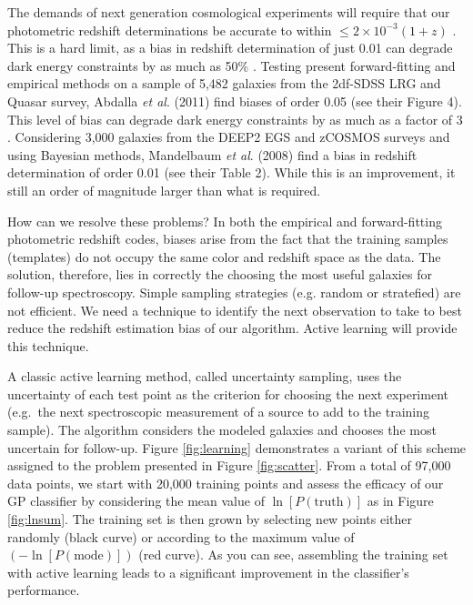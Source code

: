 \documentclass[useAMS,usenatbib,tightenlines,11pt,preprint]{aastex}
\begin{document}
The demands of next generation cosmological experiments will require
that our photometric redshift determinations be accurate to within
$\le 2\times 10^{-3}(1+z)$ \cite{desc}.  This is a hard limit, as a
bias in redshift determination of just 0.01 can degrade dark energy
constraints by as much as 50\%
\cite{kitching,huterer2006,nakajima2011}.  Testing present forward-fitting
and empirical methods on a sample of 5,482 galaxies from the 2df-SDSS
LRG and Quasar survey, Abdalla {\it et al}. (2011) find biases of
order 0.05 (see their Figure 4).  This level of bias can degrade dark
energy constraints by as much as a factor of 3 \cite{Ma2006}.
Considering 3,000 galaxies from the DEEP2 EGS and zCOSMOS surveys and
using Bayesian methods, Mandelbaum {\it et al}.  (2008) find a bias in
redshift determination of order 0.01 (see their Table 2).  While this
is an improvement, it still an order of magnitude larger than what is
required.

How can we resolve these problems?  In both the empirical and forward-fitting
photometric redshift codes, biases arise from the fact that the
training samples (templates) do not occupy the same color and redshift
space as the data.  The solution, therefore, lies in correctly the choosing the
most useful galaxies for follow-up spectroscopy.  
Simple sampling strategies (e.g. random or
stratefied) are not efficient.  We need a technique to identify the
next observation to take to best reduce the redshift estimation
bias of our algorithm.  Active learning will provide this technique.
 
A classic active learning method, called uncertainty sampling, uses
the uncertainty of each test point as the criterion for choosing the
next experiment (e.g.\ the next spectroscopic measurement of a source
to add to the training sample).  
The algorithm considers the modeled galaxies and chooses the most uncertain for
follow-up.
Figure \ref{fig:learning} demonstrates a variant of this scheme assigned to the
problem presented
in Figure \ref{fig:scatter}. From a total of 97,000 data points,
we start with 20,000 training points and assess the efficacy of our GP 
classifier by considering the mean value of $\ln[P(\text{truth})]$
as in Figure \ref{fig:lnsum}.  The training set is
then grown by selecting new points either randomly (black curve) or according to
the maximum value of $\left(-\ln[P(\text{mode})]\right)$ (red curve).  As you can see,
assembling the training set with active learning leads to a significant
improvement in the classifier's performance.
\end{document}
